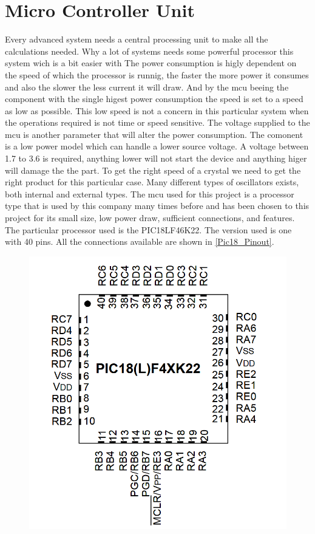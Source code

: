 


\section{Micro Controller Unit}
Every advanced system needs a central processing unit to make all the calculations needed. Why a lot of systems needs some powerful processor this system wich is a bit easier with 
The power consumption is higly dependent on the speed of which the processor is runnig, the faster the more power it consumes and also the slower the less current it will draw. And by the \gls{mcu} beeing the component with the single higest power consumption the speed is set to a speed as low as possible. This low speed is not a concern in this particular system when the operations required is not time or speed sensitive. The voltage supplied to the \gls{mcu} is another parameter that will alter the power consumption. The comonent is a low power model which can handle a lower source voltage. A voltage between 1.7 to 3.6 is required, anything lower will not start the device and anything higer will damage the the part. 
To get the right speed of a crystal we need to get the right product for this particular case. 
Many different types of oscillators exists, both internal and external types. 
The \gls{mcu} used for this project is a processor type that is used by this company many times before and has been chosen to this project for its small size, low power draw, sufficient connections, and features. The particular processor used is the PIC18LF46K22\cite{pic18}. The version used is one with 40 pins. All the connections available are shown in \autoref{Pic18_Pinout}.

\begin{figure}[H] 
\centering 
\includegraphics[width=.7\linewidth]{Figures/Pic18_pinout} 
\label{Pic18_Pinout} 
\end{figure} 


